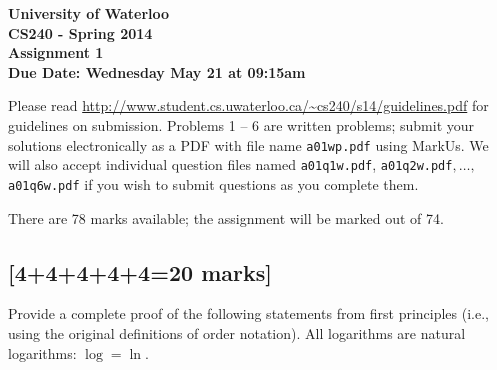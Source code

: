 \documentclass[12pt]{article}
\begin{document}
\begin{center}
{\Large\bf University of Waterloo}\\
\vspace{3mm}
{\Large\bf CS240 - Spring 2014}\\
\vspace{2mm}
{\Large\bf Assignment 1}\\
\vspace{3mm}
\textbf{Due Date: Wednesday May 21 at 09:15am}
\end{center}

\def\question#1{\item[\bf #1.]}
\def\part#1{\item[\bf #1)]}
\newcommand{\pc}[1]{\mbox{\textbf{#1}}} %

Please read
\url{http://www.student.cs.uwaterloo.ca/~cs240/s14/guidelines.pdf}
for guidelines on submission.  
Problems 1 -- 6 are written
problems; submit your solutions electronically as a PDF with file name {\tt a01wp.pdf} using MarkUs. We will also accept individual question files named {\tt a01q1w.pdf}, {\tt a01q2w.pdf}$, \dots,$ {\tt a01q6w.pdf} if you wish to submit questions as you complete them.

There are 78 marks available; the assignment will be marked out of 74.

\subsection{[4+4+4+4+4=20 marks]}
Provide a complete proof of the following statements from first principles
(i.e., using the original definitions of order notation).  All logarithms
are natural logarithms: $\log = \ln$.

\end{document}
